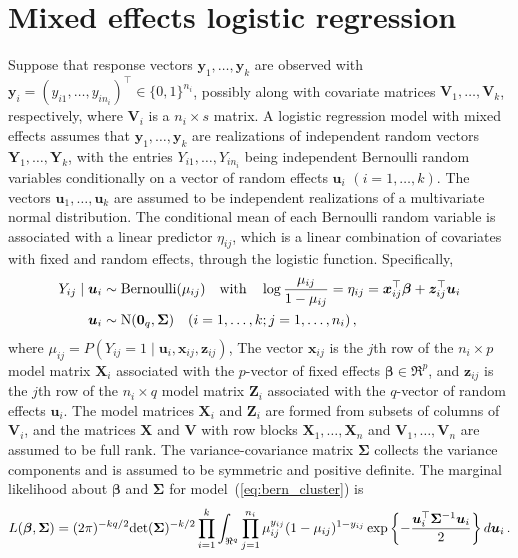 \documentclass[11pt, a4paper]{article}
\newcommand*{\bb}{\boldsymbol}
\theoremstyle{example} \newtheorem{example}{Example}[section]
\theoremstyle{theorem} \newtheorem{theorem}{Theorem}[section]
\def\det{{\mathop{\rm det}}}
\def\bbeta{\bb{\beta}}
\def\bSigma{\bb{\Sigma}}
\def\by{\bb{y}}
\def\bY{\bb{Y}}
\def\bu{\bb{u}}
\def\bx{\bb{x}}
\def\bz{\bb{z}}
\def\b0{\bb{0}}
\def\bX{\bb{X}}
\def\bZ{\bb{Z}}
\def\bV{\bb{V}}
\def\bY{\bb{Y}}
\def\by{\bb{y}}
\begin{document}
\section{Mixed effects logistic regression}
\label{sec:bern_GLMMs}

Suppose that response vectors $\by_1, \ldots, \by_k$ are observed with
$\by_i = (y_{i1}, \ldots, y_{in_i})^\top \in \{0, 1\}^{n_i}$, possibly
along with covariate matrices $\bV_1, \ldots, \bV_k$, respectively,
where $\bV_i$ is a $n_i \times s$ matrix. A logistic regression model
with mixed effects assumes that $\by_1, \ldots, \by_k$ are
realizations of independent random vectors $\bY_1, \ldots, \bY_k$,
with the entries $Y_{i1}, \ldots, Y_{in_i}$ being independent
Bernoulli random variables conditionally on a vector of random effects
$\bu_i$ $(i = 1, \ldots, k)$. The vectors $\bu_1, \ldots, \bu_k$ are
assumed to be independent realizations of a multivariate normal
distribution. The conditional
mean of each Bernoulli random variable is associated with a linear predictor
$\eta_{ij}$, which is a linear combination of covariates with fixed and random effects, through the logistic function. Specifically,
\begin{align}
\label{eq:bern_cluster}
  Y_{ij} \mid \bb{u}_i & \sim \text{Bernoulli}(\mu_{ij}) \quad \text{with} \quad
  \log\frac{\mu_{ij}}{1 - \mu_{ij}} = \eta_{ij} = \bx_{ij}^\top \bbeta + \bz_{ij}^\top \bu_i\\ \notag
  \bu_i & \sim \text{N}(\b0_q, \bb{\Sigma})  \quad (i = 1, \ldots, k; j = 1, \ldots, n_i)\,,
\end{align}
where $\mu_{ij} = P(Y_{ij} = 1 \mid \bu_i, \bx_{ij}, \bz_{ij})$,
The vector $\bx_{ij}$ is the $j$th row of the $n_i \times p$ model
matrix $\bX_{i}$ associated with the $p$-vector of fixed effects
$\bbeta \in \Re^p$, and $\bz_{ij}$ is the $j$th row of the
$n_i \times q$ model matrix $\bZ_{i}$ associated with the $q$-vector
of random effects $\bu_i$. The model matrices $\bX_i$ and $\bZ_i$ are
formed from subsets of columns of $\bV_i$, and the matrices $\bX$ and
$\bV$ with row blocks $\bX_1, \ldots, \bX_n$ and
$\bV_1, \ldots, \bV_n$ are assumed to be full rank. The
variance-covariance matrix $\bSigma$ collects the variance components
and is assumed to be symmetric and positive definite. The marginal
likelihood about $\bb{\beta}$ and $\bb{\Sigma}$ for
model~(\ref{eq:bern_cluster}) is
\begin{equation}
\label{eq:bern_likl}
L(\bbeta,\bSigma) = (2\pi)^{-kq/2} \det(\bSigma)^{-k/2} \prod_{i=1}^{k}\int_{\Re^q}\prod_{j=1}^{n_i} \mu_{ij}^{y_{ij}}(1-\mu_{ij})^{1-y_{ij}} \exp\left\{-\frac{\bu_i^\top\bSigma^{-1}\bu_i}{2} \right\} d\bu_i\, .
\end{equation}
\end{document}
